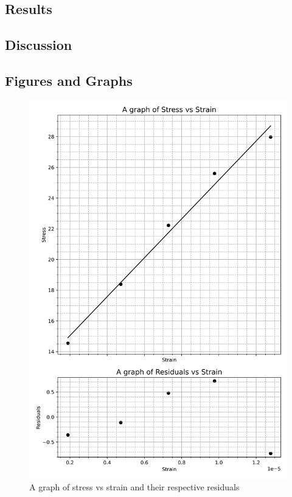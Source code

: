 \documentclass[12pt, a4paper]{article}
\begin{document}
\subsection*{Results}

\subsection*{Discussion}

\subsection*{Figures and Graphs}
\begin{figure}[H]
    \centering
    \includegraphics[width = \textwidth]{1Plot1.png}
    \caption{A graph of stress vs strain and their respective residuals}
\end{figure}
\end{document}
